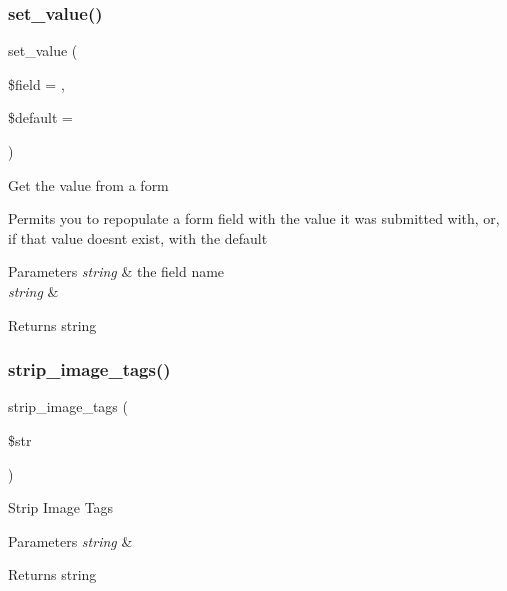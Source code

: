 \subsubsection{\texorpdfstring{set\+\_\+value()}{set\_value()}}
{\footnotesize\ttfamily set\+\_\+value (\begin{DoxyParamCaption}\item[{}]{\$field = {\ttfamily \textquotesingle{}\textquotesingle{}},  }\item[{}]{\$default = {\ttfamily \textquotesingle{}\textquotesingle{}} }\end{DoxyParamCaption})}

Get the value from a form

Permits you to repopulate a form field with the value it was submitted with, or, if that value doesn\textquotesingle{}t exist, with the default


\begin{DoxyParams}{Parameters}
{\em string} & the field name \\
\hline
{\em string} & \\
\hline
\end{DoxyParams}
\begin{DoxyReturn}{Returns}
string 
\end{DoxyReturn}
\mbox{\label{class_c_i___form__validation_abb836a42971c7bc641588db779c6ab1d}} 
\subsubsection{\texorpdfstring{strip\+\_\+image\+\_\+tags()}{strip\_image\_tags()}}
{\footnotesize\ttfamily strip\+\_\+image\+\_\+tags (\begin{DoxyParamCaption}\item[{}]{\$str }\end{DoxyParamCaption})}

Strip Image Tags


\begin{DoxyParams}{Parameters}
{\em string} & \\
\hline
\end{DoxyParams}
\begin{DoxyReturn}{Returns}
string 
\end{DoxyReturn}
\mbox{\label{class_c_i___form__validation_a9bec2f0a508e0327d4b048ecfc204522}} 
